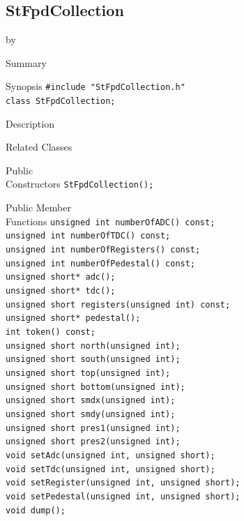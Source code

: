 \documentclass[twoside]{article}
\newcommand{\entrylabel}[1]{\mbox{\textbf{{#1}}}\hfil}%
\newenvironment{entry}
{\begin{list}{}%
    {\renewcommand{\makelabel}{\entrylabel}%
     \setlength{\labelwidth}{90pt}%
     \setlength{\leftmargin}{\labelwidth}
     \advance\leftmargin by \labelsep%
      }%
    }%
  {\end{list}}
\newcommand{\Entrylabel}[1]%
{\raisebox{0pt}[1ex][0pt]{\makebox[\labelwidth][l]%
    {\parbox[t]{\labelwidth}{\hspace{0pt}\textbf{{#1}}}}}}
\newenvironment{Entry}%
{\renewcommand{\entrylabel}{\Entrylabel}\begin{entry}}%
  {\end{entry}}
\begin{document}
\subsection{StFpdCollection}
\label{sec:StFpdCollection}
\begin{Entry}
\item[Summary]
\item[Synopsis]
    \verb+#include "StFpdCollection.h"+\\
    \verb+class StFpdCollection;+\\
\item[Description]
\item[Related Classes]
\item[Public\\ Constructors]
    \verb+StFpdCollection();+\\
\item[Public Member\\ Functions]
    \verb+unsigned int numberOfADC() const;+\\
    \verb+unsigned int numberOfTDC() const;+\\
    \verb+unsigned int numberOfRegisters() const;+\\
    \verb+unsigned int numberOfPedestal() const;+\\
    \verb+unsigned short* adc();+\\
    \verb+unsigned short* tdc();+\\
    \verb+unsigned short registers(unsigned int) const;+\\
    \verb+unsigned short* pedestal();+\\
    \verb+int token() const;+\\
    \verb+unsigned short north(unsigned int);+\\
    \verb+unsigned short south(unsigned int);+\\
    \verb+unsigned short top(unsigned int);+\\
    \verb+unsigned short bottom(unsigned int);+\\
    \verb+unsigned short smdx(unsigned int);+\\
    \verb+unsigned short smdy(unsigned int);+\\
    \verb+unsigned short pres1(unsigned int);+\\
    \verb+unsigned short pres2(unsigned int);+\\
    \verb+void setAdc(unsigned int, unsigned short);+\\
    \verb+void setTdc(unsigned int, unsigned short);+\\
    \verb+void setRegister(unsigned int, unsigned short);+\\
    \verb+void setPedestal(unsigned int, unsigned short);+\\
    \verb+void dump();+\\
\end{Entry}
\clearpage
\end{document}
